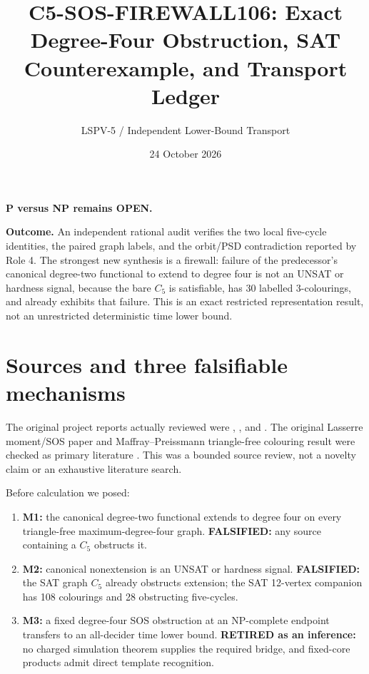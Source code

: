 \documentclass[11pt]{article}
\title{C5-SOS-FIREWALL106: Exact Degree-Four Obstruction, SAT Counterexample, and Transport Ledger}
\author{LSPV-5 / Independent Lower-Bound Transport}
\date{24 October 2026}
\begin{document}
\maketitle

\begin{center}
\textbf{P versus NP remains OPEN.}
\end{center}

\noindent\textbf{Outcome.}
An independent rational audit verifies the two local five-cycle identities,
the paired graph labels, and the orbit/PSD contradiction reported by Role 4.
The strongest new synthesis is a firewall: failure of the predecessor's
canonical degree-two functional to extend to degree four is not an UNSAT or
hardness signal, because the bare $C_5$ is satisfiable, has 30 labelled
3-colourings, and already exhibits that failure.  This is an exact restricted
representation result, not an unrestricted deterministic time lower bound.

\section{Sources and three falsifiable mechanisms}
The original project reports actually reviewed were
,
, and
.
The original Lasserre moment/SOS paper and Maffray--Preissmann
triangle-free colouring result were checked as primary literature
\cite{Lasserre,MP}.  This was a bounded source review, not a novelty claim or
an exhaustive literature search.

Before calculation we posed:
\begin{enumerate}
\item \textbf{M1:} the canonical degree-two functional extends to degree four
on every triangle-free maximum-degree-four graph.  \textbf{FALSIFIED:} any
source containing a $C_5$ obstructs it.
\item \textbf{M2:} canonical nonextension is an UNSAT or hardness signal.
\textbf{FALSIFIED:} the SAT graph $C_5$ already obstructs extension; the SAT
12-vertex companion has 108 colourings and 28 obstructing five-cycles.
\item \textbf{M3:} a fixed degree-four SOS obstruction at an NP-complete
endpoint transfers to an all-decider time lower bound.  \textbf{RETIRED as an
inference:} no charged simulation theorem supplies the required bridge, and
fixed-core products admit direct template recognition.
\end{enumerate}
\end{document}
